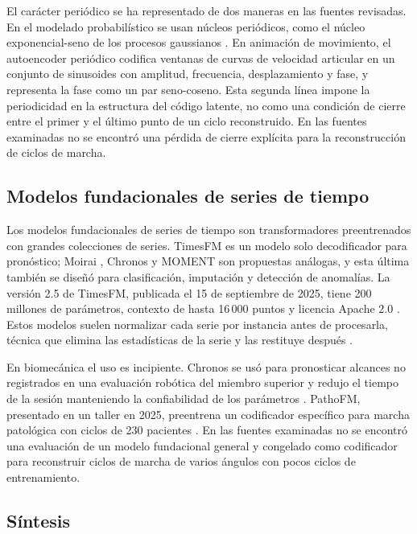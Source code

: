 \documentclass[11pt,a4paper]{article}
\begin{document}
El carácter periódico se ha representado de dos maneras en las fuentes revisadas. En el modelado probabilístico se usan núcleos periódicos, como el núcleo exponencial-seno de los procesos gaussianos \cite{rasmussen2006}. En animación de movimiento, el autoencoder periódico \cite{starke2022} codifica ventanas de curvas de velocidad articular en un conjunto de sinusoides con amplitud, frecuencia, desplazamiento y fase, y representa la fase como un par seno-coseno. Esta segunda línea impone la periodicidad en la estructura del código latente, no como una condición de cierre entre el primer y el último punto de un ciclo reconstruido. En las fuentes examinadas no se encontró una pérdida de cierre explícita para la reconstrucción de ciclos de marcha.

\subsection{Modelos fundacionales de series de tiempo}

Los modelos fundacionales de series de tiempo son transformadores preentrenados con grandes colecciones de series. TimesFM \cite{das2024timesfm} es un modelo solo decodificador para pronóstico; Moirai \cite{woo2024}, Chronos \cite{ansari2024chronos} y MOMENT \cite{goswami2024moment} son propuestas análogas, y esta última también se diseñó para clasificación, imputación y detección de anomalías. La versión 2.5 de TimesFM, publicada el 15 de septiembre de 2025, tiene 200 millones de parámetros, contexto de hasta 16\,000 puntos y licencia Apache 2.0 \cite{timesfm25}. Estos modelos suelen normalizar cada serie por instancia antes de procesarla, técnica que elimina las estadísticas de la serie y las restituye después \cite{kim2022revin}.

En biomecánica el uso es incipiente. Chronos se usó para pronosticar alcances no registrados en una evaluación robótica del miembro superior y redujo el tiempo de la sesión manteniendo la confiabilidad de los parámetros \cite{akbarifar2025}. PathoFM, presentado en un taller en 2025, preentrena un codificador específico para marcha patológica con ciclos de 230 pacientes \cite{dey2025}. En las fuentes examinadas no se encontró una evaluación de un modelo fundacional general y congelado como codificador para reconstruir ciclos de marcha de varios ángulos con pocos ciclos de entrenamiento.

\subsection{Síntesis}
\end{document}
